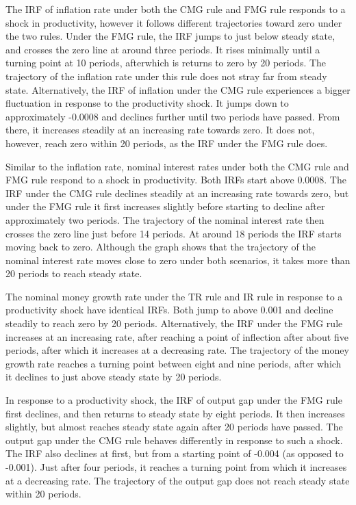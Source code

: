 \documentclass[11pt,preprint, authoryear]{elsarticle}
\numberwithin{equation}{section}
\numberwithin{figure}{section}
\numberwithin{table}{section}
\begin{document}
The IRF of inflation rate under both the CMG rule and FMG rule responds
to a shock in productivity, however it follows different trajectories
toward zero under the two rules. Under the FMG rule, the IRF jumps to
just below steady state, and crosses the zero line at around three
periods. It rises minimally until a turning point at 10 periods,
afterwhich is returns to zero by 20 periods. The trajectory of the
inflation rate under this rule does not stray far from steady state.
Alternatively, the IRF of inflation under the CMG rule experiences a
bigger fluctuation in response to the productivity shock. It jumps down
to approximately -0.0008 and declines further until two periods have
passed. From there, it increases steadily at an increasing rate towards
zero. It does not, however, reach zero within 20 periods, as the IRF
under the FMG rule does.

Similar to the inflation rate, nominal interest rates under both the CMG
rule and FMG rule respond to a shock in productivity. Both IRFs start
above 0.0008. The IRF under the CMG rule declines steadily at an
increasing rate towards zero, but under the FMG rule it first increases
slightly before starting to decline after approximately two periods. The
trajectory of the nominal interest rate then crosses the zero line just
before 14 periods. At around 18 periods the IRF starts moving back to
zero. Although the graph shows that the trajectory of the nominal
interest rate moves close to zero under both scenarios, it takes more
than 20 periods to reach steady state.

The nominal money growth rate under the TR rule and IR rule in response
to a productivity shock have identical IRFs. Both jump to above 0.001
and decline steadily to reach zero by 20 periods. Alternatively, the IRF
under the FMG rule increases at an increasing rate, after reaching a
point of inflection after about five periods, after which it increases
at a decreasing rate. The trajectory of the money growth rate reaches a
turning point between eight and nine periods, after which it declines to
just above steady state by 20 periods.

In response to a productivity shock, the IRF of output gap under the FMG
rule first declines, and then returns to steady state by eight periods.
It then increases slightly, but almost reaches steady state again after
20 periods have passed. The output gap under the CMG rule behaves
differently in response to such a shock. The IRF also declines at first,
but from a starting point of -0.004 (as opposed to -0.001). Just after
four periods, it reaches a turning point from which it increases at a
decreasing rate. The trajectory of the output gap does not reach steady
state within 20 periods.
\end{document}
